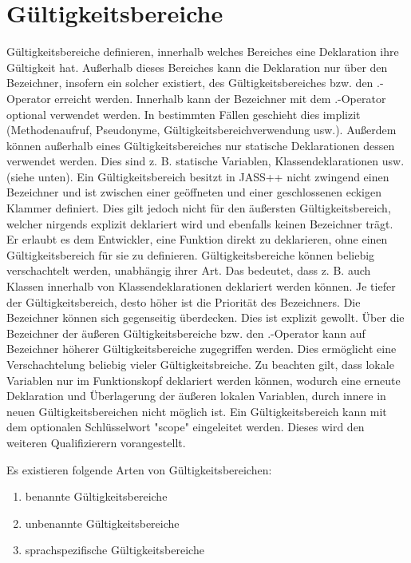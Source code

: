 \chapter{Gültigkeitsbereiche}
Gültigkeitsbereiche definieren, innerhalb welches Bereiches eine Deklaration ihre Gültigkeit hat. Außerhalb dieses Bereiches
kann die Deklaration nur über den Bezeichner, insofern ein solcher existiert, des Gültigkeitsbereiches bzw. den .-Operator erreicht werden.
Innerhalb kann der Bezeichner mit dem .-Operator optional verwendet werden.
In bestimmten Fällen geschieht dies implizit (Methodenaufruf, Pseudonyme, Gültigkeitsbereichverwendung usw.).
Außerdem können außerhalb eines Gültigkeitsbereiches nur statische Deklarationen dessen verwendet werden.
Dies sind z. B. statische Variablen, Klassendeklarationen usw. (siehe unten).
Ein Gültigkeitsbereich besitzt in JASS++ nicht zwingend einen Bezeichner und ist zwischen einer geöffneten und einer geschlossenen eckigen
Klammer definiert.
Dies gilt jedoch nicht für den äußersten Gültigkeitsbereich, welcher nirgends explizit deklariert wird und ebenfalls keinen Bezeichner trägt.
Er erlaubt es dem Entwickler, eine Funktion direkt zu deklarieren, ohne einen Gültigkeitsbereich für sie zu definieren.
Gültigkeitsbereiche können beliebig verschachtelt werden, unabhängig ihrer Art. Das bedeutet, dass z. B. auch Klassen innerhalb von
Klassendeklarationen deklariert werden können.
Je tiefer der Gültigkeitsbereich, desto höher ist die Priorität des Bezeichners. Die Bezeichner können sich gegenseitig überdecken.
Dies ist explizit gewollt. Über die Bezeichner der äußeren Gültigkeitsbereiche bzw. den .-Operator kann auf Bezeichner höherer
Gültigkeitsbereiche zugegriffen werden. Dies ermöglicht eine Verschachtelung beliebig vieler Gültigkeitsbreiche.
Zu beachten gilt, dass lokale Variablen nur im Funktionskopf deklariert werden können, wodurch eine erneute Deklaration und Überlagerung
der äußeren lokalen Variablen, durch innere in neuen Gültigkeitsbereichen nicht möglich ist.
Ein Gültigkeitsbereich kann mit dem optionalen Schlüsselwort "scope" eingeleitet werden. Dieses wird den weiteren Qualifizierern vorangestellt.

Es existieren folgende Arten von Gültigkeitsbereichen:
\begin{enumerate}
\item benannte Gültigkeitsbereiche
\item unbenannte Gültigkeitsbereiche
\item sprachspezifische Gültigkeitsbereiche
\end{enumerate}

